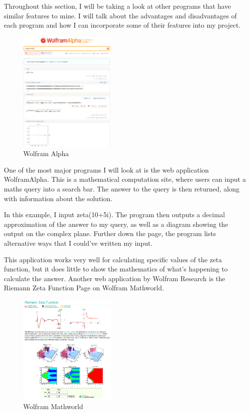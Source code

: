 \documentclass{article}
\begin{document}
Throughout this section, I will be taking a look at other programs that have similar features to mine. I will talk about the advantages and disadvantages of each program and how I can incorporate some of their features into my project.

\begin{figure}
    \centering
    \captionsetup{justification=centering}
    \includegraphics[width=1.9in]{wolfram-alpha}
    \caption{Wolfram Alpha}
\end{figure}

One of the most major programs I will look at is the web application WolframAlpha. This is a mathematical computation site, where users can input a maths query into a search bar. The answer to the query is then returned, along with information about the solution.

In this example, I input zeta(10+5i). The program then outputs a decimal approximation of the answer to my query, as well as a diagram showing the output on the complex plane. Further down the page, the program lists alternative ways that I could’ve written my input.

This application works very well for calculating specific values of the zeta function, but it does little to show the mathematics of what’s happening to calculate the answer.
\clearpage
Another web application by Wolfram Research is the Riemann Zeta Function Page on Wolfram Mathworld.

\begin{figure}
    \centering
    \captionsetup{justification=centering}
    \includegraphics[width=1.9in]{wolfram-mathworld}
    \caption{Wolfram Mathworld}
\end{figure}
\end{document}

